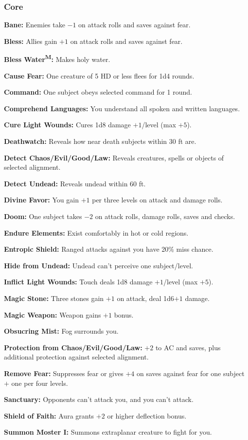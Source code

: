 \documentclass{spelllist}
\begin{document}
  \subsubsection*{Core}
  \begin{flushleft}
    \textbf{Bane:} Enemies take $-1$ on attack rolls and saves against fear.
    
    \textbf{Bless:} Allies gain $+1$ on attack rolls and saves against fear.
    
    \textbf{Bless Water\textsuperscript{M}:} Makes holy water.
    
    \textbf{Cause Fear:} One creature of 5 HD or less flees for 1d4 rounds.
    
    \textbf{Command:} One subject obeys selected command for 1 round.
    
    \textbf{Comprehend Languages:} You understand all spoken and written languages.
    
    \textbf{Cure Light Wounds:} Cures 1d8 damage $+1$/level (max $+5$).
    
    \textbf{Deathwatch:} Reveals how near death subjects within 30 ft are.
    
    \textbf{Detect Chaos/Evil/Good/Law:} Reveals creatures, spells or objects of selected alignment.
    
    \textbf{Detect Undead:} Reveals undead within 60 ft.
    
    \textbf{Divine Favor:} You gain $+1$ per three levels on attack and damage rolls.
    
    \textbf{Doom:} One subject takes $-2$ on attack rolls, damage rolls, saves and checks.
    
    \textbf{Endure Elements:} Exist comfortably in hot or cold regions.
    
    \textbf{Entropic Shield:} Ranged attacks against you have 20\% miss chance.
    
    \textbf{Hide from Undead:} Undead can't perceive one subject/level.
    
    \textbf{Inflict Light Wounds:} Touch deals 1d8 damage $+1$/level (max $+5$).
    
    \textbf{Magic Stone:} Three stones gain $+1$ on attack, deal 1d6$+1$ damage.
    
    \textbf{Magic Weapon:} Weapon gains $+1$ bonus.
    
    \textbf{Obsucring Mist:} Fog surrounds you.
    
    \textbf{Protection from Chaos/Evil/Good/Law:} $+2$ to AC and saves, plus additional protection against selected alignment.
    
    \textbf{Remove Fear:} Suppresses fear or gives $+4$ on saves against fear for one subject $+$ one per four levels.
    
    \textbf{Sanctuary:} Opponents can't attack you, and you can't attack.
    
    \textbf{Shield of Faith:} Aura grants $+2$ or higher deflection bonus.
    
    \textbf{Summon Moster I:} Summons extraplanar creature to fight for you.
  \end{flushleft}
  
\end{document}
